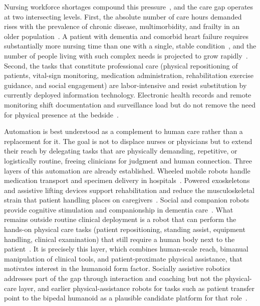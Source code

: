 Nursing workforce shortages compound this pressure~\cite{lasater2021,aiken2014nurse},
and the care gap operates at two intersecting levels. First, the absolute number
of care hours demanded rises with the prevalence of chronic disease,
multimorbidity, and frailty in an older
population~\cite{barnett2012epidemiology,clegg2013frailty}. A patient with
dementia and comorbid heart failure requires substantially more nursing time
than one with a single, stable
condition~\cite{gopfert2021primary,arling2003cognitive,moth2012chronic}, and the
number of people living with such complex needs is projected to grow
rapidly~\cite{kingston2018projections,prince2015burden,chowdhury2023global}.
Second, the tasks that constitute professional care (physical repositioning of
patients, vital-sign monitoring, medication administration, rehabilitation
exercise guidance, and social engagement) are labor-intensive and resist
substitution by currently deployed information technology. Electronic health
records and remote monitoring shift documentation and surveillance load but do
not remove the need for physical presence at the
bedside~\cite{sinsky2016allocation,sun2020nurses,koehler2018efficacy}.

Automation is best understood as a complement to human care rather than a
replacement for it. The goal is not to displace nurses or physicians but to
extend their reach by delegating tasks that are physically demanding, repetitive,
or logistically routine, freeing clinicians for judgment and human connection.
Three layers of this automation are already established. Wheeled mobile robots
handle medication transport and specimen delivery in
hospitals~\cite{bloss2011mobile,ozkil2009service,fragapane2021autonomous}.
Powered exoskeletons and assistive lifting devices support rehabilitation and
reduce the musculoskeletal strain that patient handling places on
caregivers~\cite{nelson2006evidence,theurel2019occupational,mehrholz2017electromechanical}.
Social and companion robots provide cognitive stimulation and companionship in
dementia care~\cite{pu2019effectiveness,mordoch2013social,wada2007living}. What
remains outside routine clinical deployment is a robot that can perform the
hands-on physical care tasks (patient repositioning, standing assist, equipment
handling, clinical examination) that still require a human body next to the
patient~\cite{sorensen2025humanoid}. It is precisely this layer, which combines
human-scale reach, bimanual manipulation of clinical tools, and
patient-proximate physical assistance, that motivates interest in the humanoid
form factor. Socially assistive robotics~\cite{feilseifer2005defining,riek2017healthcare}
addresses part of the gap through interaction and coaching but not the
physical-care layer, and earlier physical-assistance robots for tasks such as
patient transfer point to the bipedal humanoid as a plausible candidate platform
for that role~\cite{mukai2010riba,ding2014rona,desantis2008atlas}.

